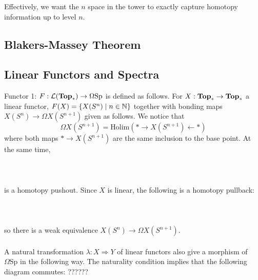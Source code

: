 \documentclass[a4paper]{article}
\begin{document}
Effectively, we want the $n$ space in the tower to exactly capture homotopy information up to level $n$. 

\subsection{Blakers-Massey Theorem}

\subsection{Linear Functors and Spectra}
Functor 1: $F:\mathcal{L}(\bold{Top}_\ast)\to\Omega\text{Sp}$ is defined as follows. For $X:\bold{Top}_\ast\to\bold{Top}_\ast$ a linear functor, $F(X)=\{X(S^n)\;|\;n\in\mathbb{N}\}$ together with bonding maps $X(S^n)\to\Omega X(S^{n+1})$ given as follows. We notice that $$\Omega X(S^{n+1})=\text{Holim}(\ast\rightarrow X(S^{n+1})\leftarrow\ast)$$ where both maps $\ast\to X(S^{n+1})$ are the same inclusion to the base point. At the same time, \\~\\
\\~\\
is a homotopy pushout. Since $X$ is linear, the following is a homotopy pullback: \\~\\
\\~\\
so there is a weak equivalence $X(S^n)\to\Omega X(S^{n+1})$. \\~\\

A natural transformation $\lambda:X\Rightarrow Y$ of linear functors also give a morphism of $\Omega\text{Sp}$ in the following way. The naturality condition implies that the following diagram commutes: ??????\\~\\
\end{document}
